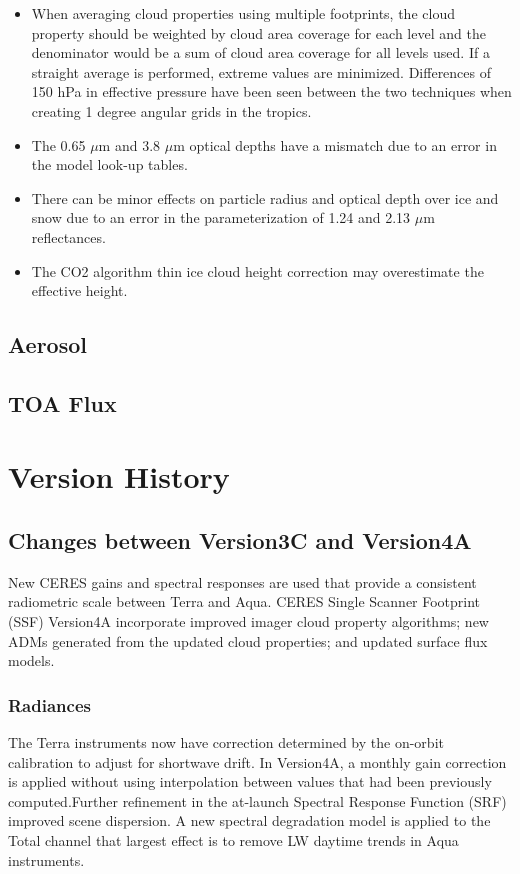 \documentclass[12pt]{article}
\begin{document}
\begin{itemize}
	 \item When averaging cloud properties using multiple footprints, the cloud property should be weighted by cloud area coverage for each level and the denominator would be a sum of cloud area coverage for all levels used. If a straight average is performed, extreme values are minimized. Differences of 150 hPa in effective pressure have been seen between the two techniques when creating 1 degree angular grids in the tropics.
	 
	 \item The 0.65 $\mu$m and 3.8 $\mu$m optical depths have a mismatch due to an error in the model look-up tables.
	 
	 \item There can be minor effects on particle radius and optical depth over ice and snow due to an error in the parameterization of 1.24 and 2.13 $\mu$m reflectances.
	 
	 \item The CO2 algorithm thin ice cloud height correction may overestimate the effective height.
	 
\end{itemize}
\subsection{Aerosol}\label{aerosol}
\subsection{TOA Flux}\label{toa}
\section{Version History}\label{history}
\subsection{Changes between Version3C and Version4A}
New CERES gains and spectral responses are used that provide a consistent radiometric scale between Terra and Aqua. CERES Single Scanner Footprint (SSF) Version4A incorporate improved imager cloud property algorithms; new ADMs generated from the updated cloud properties; and updated surface flux models.
\subsubsection{Radiances}
The Terra instruments now have correction determined by the on-orbit calibration to adjust for shortwave drift. In Version4A, a monthly gain correction is applied without using interpolation between values that had been previously computed.Further refinement in the at-launch Spectral Response Function (SRF) improved scene dispersion. A new spectral degradation model is applied to the Total channel that largest effect is to remove LW daytime trends in Aqua instruments. 
\end{document}
